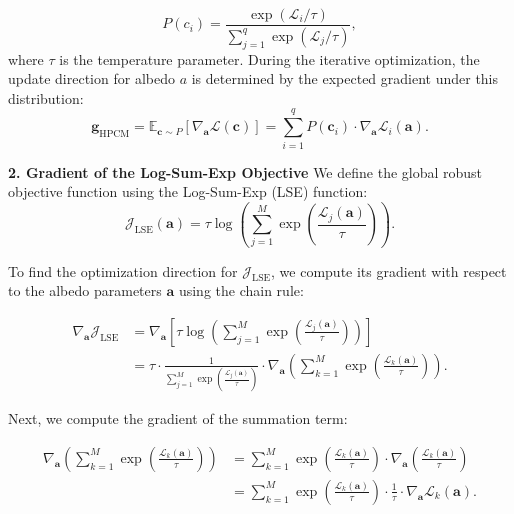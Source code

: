 \begin{equation}
    P(c_i) = \frac{\exp(\mathcal{L}_i/\tau)}{\sum_{j=1}^{q} \exp(\mathcal{L}_j/\tau)},
\end{equation}
where $\tau$ is the temperature parameter.
During the iterative optimization, the update direction for albedo $a$ is determined by the expected gradient under this distribution:
\begin{equation}
    \mathbf{g}_{\text{HPCM}} = \mathbb{E}_{\bm{c} \sim P} [\nabla_{\mathbf{a}} \mathcal{L}(\bm{c})] = \sum_{i=1}^{q} P(\bm{c}_i) \cdot \nabla_{\mathbf{a}} \mathcal{L}_i(\mathbf{a}).
\end{equation}


\textbf{2. Gradient of the Log-Sum-Exp Objective}
We define the global robust objective function using the Log-Sum-Exp (LSE) function:
\begin{equation}
    \mathcal{J}_{\text{LSE}}(\mathbf{a}) = \tau \log \left( \sum_{j=1}^{M} \exp \left( \frac{\mathcal{L}_j(\mathbf{a})}{\tau} \right) \right).
\end{equation}


To find the optimization direction for $\mathcal{J}_{\text{LSE}}$, we compute its gradient with respect to the albedo parameters $\mathbf{a}$ using the chain rule:

\begin{equation}
\begin{aligned}
\nabla_{\mathbf{a}} \mathcal{J}_{\text{LSE}} &= \nabla_{\mathbf{a}} \left[ \tau \log \left( \sum_{j=1}^{M} \exp \left( \frac{\mathcal{L}_j(\mathbf{a})}{\tau} \right) \right) \right] \\
&= \tau \cdot \frac{1}{\sum_{j=1}^{M} \exp \left( \frac{\mathcal{L}_j(\mathbf{a})}{\tau} \right)} \cdot \nabla_{\mathbf{a}} \left( \sum_{k=1}^{M} \exp \left( \frac{\mathcal{L}_k(\mathbf{a})}{\tau} \right) \right).
\end{aligned}
\end{equation}


Next, we compute the gradient of the summation term:

\begin{equation}
\begin{aligned}
\nabla_{\mathbf{a}} \left( \sum_{k=1}^{M} \exp \left( \frac{\mathcal{L}_k(\mathbf{a})}{\tau} \right) \right) &= \sum_{k=1}^{M} \exp \left( \frac{\mathcal{L}_k(\mathbf{a})}{\tau} \right) \cdot \nabla_{\mathbf{a}} \left( \frac{\mathcal{L}_k(\mathbf{a})}{\tau} \right) \\
&= \sum_{k=1}^{M} \exp \left( \frac{\mathcal{L}_k(\mathbf{a})}{\tau} \right) \cdot \frac{1}{\tau} \cdot \nabla_{\mathbf{a}} \mathcal{L}_k(\mathbf{a}).
\end{aligned}
\end{equation}

